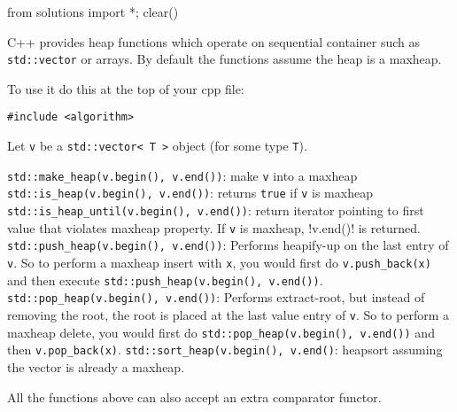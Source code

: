 \begin{python0}
from solutions import *; clear()
\end{python0}

C++ provides heap functions
which operate on sequential container such as \verb!std::vector!
or arrays.
By default the functions assume the heap is a maxheap.

To use it do this at the top of your cpp file:
\begin{Verbatim}[frame=single, fontsize=\small]
#include <algorithm>
\end{Verbatim}

Let \verb!v! be a \verb!std::vector< T >! object (for some type \verb!T!).
\begin{enumerate}[nosep]
  \li \verb!std::make_heap(v.begin(), v.end())!: make \verb!v! into a maxheap
  \li \verb!std::is_heap(v.begin(), v.end())!: returns \verb!true! if \verb!v! is maxheap
  \li \verb!std::is_heap_until(v.begin(), v.end())!:
  return iterator pointing to first value that violates maxheap property.
  If \verb!v! is maxheap, !v.end()! is returned.
  \li \verb!std::push_heap(v.begin(), v.end())!: Performs heapify-up on
  the last entry of \verb!v!.
  So to perform a maxheap insert with \verb!x!, you would first
  do \verb!v.push_back(x)! and then execute
  \verb!std::push_heap(v.begin(), v.end())!.
  \li \verb!std::pop_heap(v.begin(), v.end())!: Performs extract-root,
  but instead of removing the root,
  the root is placed at the last value entry of \verb!v!.
  So to perform a maxheap delete, you would first
  do \verb!std::pop_heap(v.begin(), v.end())!
  and then \verb!v.pop_back(x)!.
  \li \verb!std::sort_heap(v.begin(), v.end()!: heapsort assuming the
  vector is already a maxheap.
\end{enumerate}
All the functions above can also accept an extra comparator functor.

